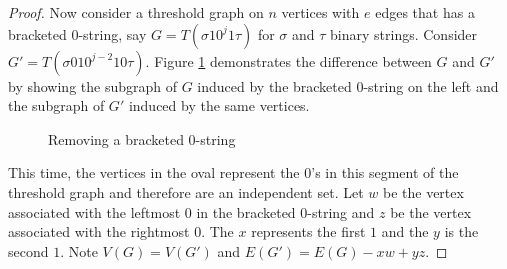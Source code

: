 \documentclass[12pt]{amsart}
\theoremstyle{plain}
\theoremstyle{definition}
\begin{document}
\begin{proof}
Now consider a threshold graph on $n$ vertices with $e$ edges that has a bracketed 0-string, say $G = T(\sigma 10^j 1 \tau)$ for $\sigma$ and $\tau$ binary strings. Consider $G' = T(\sigma 010^{j-2} 10\tau)$. Figure \ref{fig:Bracketed0String}  demonstrates the difference between $G$ and $G'$ by showing the subgraph of $G$ induced by the bracketed 0-string on the left and the subgraph of $G'$ induced by the same vertices.

\begin{figure}[!ht]
\begin{center}
\caption{Removing a bracketed 0-string}
\label{fig:Bracketed0String}
\end{center}
\end{figure}




This time, the vertices in the oval represent the $0$'s in this segment of the threshold graph and therefore are an independent set.  Let $w$ be the vertex associated with the leftmost 0 in the bracketed 0-string and $z$ be the vertex associated with the rightmost $0$.  The $x$ represents the first $1$ and the $y$ is the second $1$.  Note $V(G)=V(G')$ and $E(G') = E(G) - xw + yz$.  


\end{proof}
\end{document}

